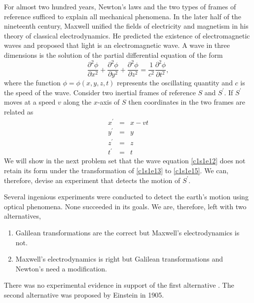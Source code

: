 For almost two hundred years, Newton's laws and the two types of frames of 
reference sufficed to explain all mechanical phenomena. In the later half of
the nineteenth century, Maxwell unified the fields of electricity and magnetism
in his theory of classical electrodynamics. He predicted the existence of 
electromagnetic waves and proposed that light is an electromagnetic wave. A
wave in three dimensions is the solution of the partial differential equation
of the form
\begin{equation}\label{c1s1e12}
\frac{\partial^2\phi}{\partial x^2} + \frac{\partial^2\phi}{\partial y^2} +
\frac{\partial^2\phi}{\partial z^2} = 
\frac{1}{c^2}\frac{\partial^2\phi}{\partial t^2},
\end{equation}
where the function $\phi = \phi(x, y, z, t)$ represents the oscillating 
quantity and $c$ is the speed of the wave. Consider two inertial frames of 
reference $S$ and $S^\prime$. If $S^\prime$ moves at a speed $v$ along the 
$x$-axis of $S$ then coordinates in the two frames are related as
\begin{eqnarray}
x^\prime &=& x - vt \label{c1s1e13} \\
y^\prime &=& y \label{c1s1e14} \\
z^\prime &=& z \label{c1s1e15} \\
t^\prime &=& t \label{c1s1e16}
\end{eqnarray}
We will show in the next problem set that the wave equation \eqref{c1s1e12}
does not retain its form under the transformation of \eqref{c1s1e13} to
\eqref{c1s1e15}. We can, therefore, devise an experiment that detects the
motion of $S^\prime$.

Several ingenious experiments were conducted to detect the earth's motion using
optical phenomena. None succeeded in its goals. We are, therefore, left with
two alternatives,
\begin{enumerate}
\item Galilean transformations are the correct but Maxwell's electrodynamics is
not.
\item Maxwell's electrodynamics is right but Galilean transformations and 
Newton's need a modification.
\end{enumerate}
There was no experimental evidence in support of the first alternative
\cite{panofsky2005classical}. The second alternative was proposed by Einstein 
\cite{einstein1905electrodynamics} in 1905.
